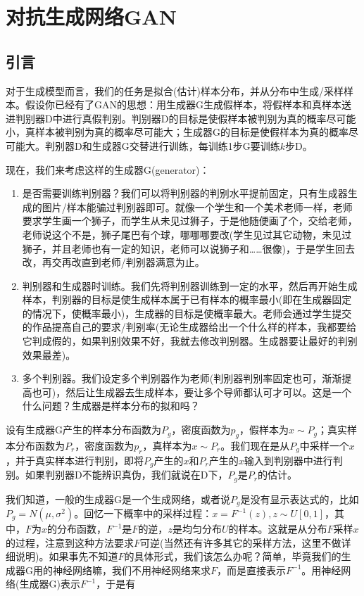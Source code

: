 
\section{对抗生成网络GAN}
    \subsection{引言}
        \par
        对于生成模型而言，我们的任务是拟合(估计)样本分布，并从分布中生成/采样样本。假设你已经有了GAN的思想：用生成器G生成假样本，将假样本和真样本送进判别器D中进行真假判别。判别器D的目标是使假样本被判别为真的概率尽可能小，真样本被判别为真的概率尽可能大；生成器G的目标是使假样本为真的概率尽可能大。判别器D和生成器G交替进行训练，每训练1步G要训练$k$步D。
        \par
        现在，我们来考虑这样的生成器G(generator)：
        \begin{enumerate}
        \item 是否需要训练判别器？我们可以将判别器的判别水平提前固定，只有生成器生成的图片/样本能骗过判别器即可。就像一个学生和一个美术老师一样，老师要求学生画一个狮子，而学生从未见过狮子，于是他随便画了个，交给老师，老师说这个不是，狮子尾巴有个球，哪哪哪要改(学生见过其它动物，未见过狮子，并且老师也有一定的知识，老师可以说狮子和……很像)，于是学生回去改，再交再改直到老师/判别器满意为止。
        \item 判别器和生成器时训练。我们先将判别器训练到一定的水平，然后再开始生成样本，判别器的目标是使生成样本属于已有样本的概率最小(即在生成器固定的情况下，使概率最小)，生成器的目标是使概率最大。老师会通过学生提交的作品提高自己的要求/判别率(无论生成器给出一个什么样的样本，我都要给它判成假的，如果判别效果不好，我就去修改判别器。生成器要让最好的判别效果最差)。
        \item 多个判别器。我们设定多个判别器作为老师(判别器判别率固定也可，渐渐提高也可)，然后让生成器去生成样本，要让多个导师都认可才可以。这是一个什么问题？生成器是样本分布的拟和吗？
        \end{enumerate}
        \par
        设有生成器G产生的样本分布函数为$P_g$，密度函数为$p_g$，假样本为$x\sim P_g$；真实样本分布函数为$P_r$，密度函数为$p_r$，真样本为$x\sim P_r$。我们现在是从$P_g$中采样一个$x$，并于真实样本进行判别，即将$P_g$产生的$x$和$P_r$产生的$x$输入到判别器中进行判别。如果判别器D不能辨识真伪，我们就说在D下，$P_g$是$P_r$的估计。
        \par
        我们知道，一般的生成器G是一个生成网络，或者说$P_g$是没有显示表达式的，比如$P_g = N(\mu,\sigma^2)$。回忆一下概率中的采样过程：$x = F^{-1}(z),z\sim U[0,1]$，其中，$F$为$x$的分布函数，$F^{-1}$是$F$的逆，$z$是均匀分布$U$的样本。这就是从分布$F$采样$x$的过程，注意到这种方法要求$F$可逆(当然还有许多其它的采样方法，这里不做详细说明)。如果事先不知道$F$的具体形式，我们该怎么办呢？简单，毕竟我们的生成器G用的神经网络嘛，我们不用神经网络来求$F$，而是直接表示$F^{-1}$。用神经网络(生成器G)表示$F^{-1}$，于是有
